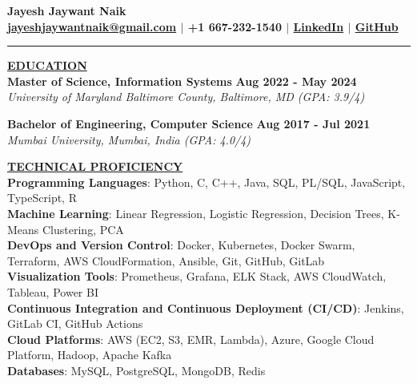 \documentclass{article}
\begin{document}
\begin{center}
\thispagestyle{empty}
\large \textbf{Jayesh Jaywant Naik \\}
\normalsize \textbf{\href{mailto:jayeshjaywantnaik@gmail.com}{jayeshjaywantnaik@gmail.com} $\mid$ +1 667-232-1540 $\mid$ \href{https://www.linkedin.com/in/jayeshjnaik}{LinkedIn} $\mid$ \href{https://github.com/jayeshjnaik}{GitHub} \\}
\rule{\textwidth}{1pt}
\end{center}

\noindent \textbf{\underline{EDUCATION}} \\
\textbf{Master of Science, Information Systems } \hfill \textbf{Aug 2022 - May 2024} \\
\textit{University of Maryland Baltimore County, Baltimore, MD (GPA: 3.9/4)}  
\begin{itemize}[noitemsep,nolistsep,leftmargin=*]
\end{itemize}
\begin{itemize}
\end{itemize}
\textbf{Bachelor of Engineering, Computer Science} \hfill \textbf{Aug 2017 - Jul 2021} \\
\textit{Mumbai University, Mumbai, India (GPA: 4.0/4)}\\
\begin{itemize}[noitemsep,nolistsep,leftmargin=*]
\end{itemize}


\noindent \textbf{\underline{TECHNICAL PROFICIENCY}} \\
\textbf{Programming Languages}{: \small Python, C, C++, Java, SQL, PL/SQL, JavaScript, TypeScript, R} \\
\textbf{Machine Learning}{: \small Linear Regression, Logistic Regression, Decision Trees, K-Means Clustering, PCA} \\
\textbf{DevOps and Version Control}{: \small Docker, Kubernetes, Docker Swarm, Terraform, AWS CloudFormation, Ansible, Git, GitHub, GitLab} \\
\textbf{Visualization Tools}{: \small Prometheus, Grafana, ELK Stack, AWS CloudWatch, Tableau, Power BI} \\
\textbf{Continuous Integration and Continuous Deployment (CI/CD)}{: \small Jenkins, GitLab CI, GitHub Actions} \\
\textbf{Cloud Platforms}{: \small AWS (EC2, S3, EMR, Lambda), Azure, Google Cloud Platform, Hadoop, Apache Kafka} \\
\textbf{Databases}{: \small MySQL, PostgreSQL, MongoDB, Redis} \\
\end{document}
